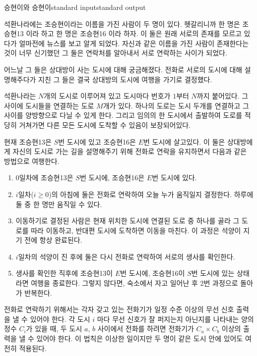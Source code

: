 \begin{problem}{승현이와 승현이}{standard input}{standard output}

석환나라에는 조승현이라는 이름을 가진 사람이 두 명이 있다. 헷갈리니까 한 명은 조승현13 이라 하고 한 명은 조승현16 이라 하자. 이 둘은 원래 서로의 존재를 모르고 있다가 얼마전에 뉴스를 보고 알게 되었다. 자신과 같은 이름을 가진 사람이 존재한다는 것이 너무 신기했던 그 둘은 연락처를 알아내서 서로 연락하는 사이가 되었다.

어느날 그 들은 상대방이 사는 도시에 대해 궁금해졌다. 전화로 서로의 도시에 대해 설명해주다가 지친 그 들은 결국 상대방의 도시에 여행을 가기로 결정했다.

석환나라는 $N$개의 도시로 이루어져 있고 도시마다 번호가 $1$부터 $N$까지 붙어있다. 그 사이에 도시들을 연결하는 도로 $M$개가 있다. 하나의 도로는 도시 두개를 연결하고 그 사이를 양방향으로 다닐 수 있게 한다. 그리고 임의의 한 도시에서 출발하여 도로를 적당히 거쳐가면 다른 모든 도시에 도착할 수 있음이 보장되어있다.

현재 조승현13은 $S$번 도시에 있고 조승현16은 $E$번 도시에 살고있다. 이 둘은 상대방에게 자신의 도시로 가는 길을 설명해주기 위해 전화로 연락을 유지하면서 다음과 같은 방법으로 여행한다.

\begin{enumerate}
\item 0일차에 조승현13은 $S$번 도시에, 조승현16은 $E$번 도시에 있다.
\item $i$일차($i \ge 0$)의 아침에 둘은 전화로 연락하여 오늘 누가 움직일지 결정한다. 하루에 둘 중 한 명만 움직일 수 있다.
\item 이동하기로 결정된 사람은 현재 위치한 도시에 연결된 도로 중 하나를 골라 그 도로를 따라 이동하고, 반대편 도시에 도착하면 이동을 마친다. 이 과정은 석양이 지기 전에 항상 완료된다.
\item $i$일차의 석양이 진 후에 둘은 다시 전화로 연락하여 서로의 생사를 확인한다.
\item 생사를 확인한 직후에 조승현13이 $E$번 도시에, 조승현16이 $S$번 도시에 있는 상태라면 여행을 종료한다. 그렇지 않다면, 숙소에서 자고 일어난 후 2번 과정으로 돌아가 반복한다.
\end{enumerate}

전화로 연락하기 위해서는 각자 갖고 있는 전화기가 일정 수준 이상의 무선 신호 출력을 낼 수 있어야 한다. 각 도시 $i$ 마다 무선 신호가 잘 퍼지는지 아닌지를 나타내는 양의 정수 $C_i$가 있을 때, 두 도시 $a$, $b$ 사이에서 전화를 하려면 전화기가 $C_a \times C_b$ 이상의 출력을 낼 수 있어야 한다. 이 법칙은 이상한 일이지만 두 명이 같은 도시 안에 있어도 여전히 적용된다.


\end{problem}

